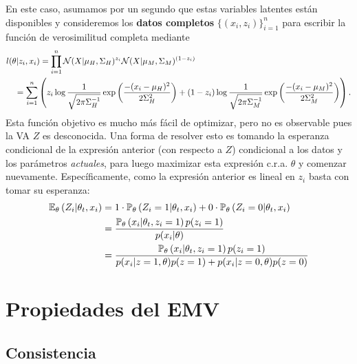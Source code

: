 En este caso, asumamos por un segundo que estas variables latentes están disponibles y consideremos los \textbf{datos completos} $\{(x_i,z_i)\}_{i=1}^n$ para escribir la función de verosimilitud completa mediante
\begin{align*}
	l(\theta|z_i,x_i) &= \prod_{i=1}^n \cN(X|\mu_H,\Sigma_H)^{z_i} \cN(X|\mu_M,\Sigma_M)^{(1-z_i)}\\
	&\hspace{-3em}= \sum_{i=1}^n \left( z_i\log\frac{1}{\sqrt{2\pi\Sigma_H^{-1}}}\expo{\frac{-(x_i-\mu_H)^2}{2\Sigma^2_H}} + (1-z_i)\log\frac{1}{\sqrt{2\pi\Sigma_M^{-1}}}\expo{\frac{-(x_i-\mu_M)^2}{2\Sigma^2_M}}\right).
\end{align*}
Esta función objetivo es mucho más fácil de optimizar, pero no es observable pues la VA $Z$ es desconocida. Una forma de resolver esto es tomando la esperanza condicional de la expresión anterior (con respecto a $Z$) condicional a los datos y los parámetros \textit{actuales}, para luego maximizar esta expresión c.r.a. $\theta$ y comenzar nuevamente. Específicamente, como la expresión anterior es lineal en $z_i$ basta con tomar su esperanza: 
\begin{align*}
	\mathbb{E}_\theta \left(Z_i|\theta_t,x_i\right) &= 1\cdot\mathbb{P}_\theta \left(Z_i=1|\theta_t,x_i\right) + 0\cdot\mathbb{P}_\theta \left(Z_i=0|\theta_t,x_i\right)\\
	&= 	\frac{\mathbb{P}_\theta \left(x_i|\theta_t,z_i=1\right) p(z_i=1)}{p(x_i|\theta)}\\
	&= 	\frac{\mathbb{P}_\theta \left(x_i|\theta_t,z_i=1\right) p(z_i=1)}{p(x_i|z=1,\theta)p(z=1)+p(x_i|z=0	,\theta)p(z=0)}
\end{align*}








\section{Propiedades del EMV} 
\label{sec:propiedades_EMV}
\subsection{Consistencia} 

